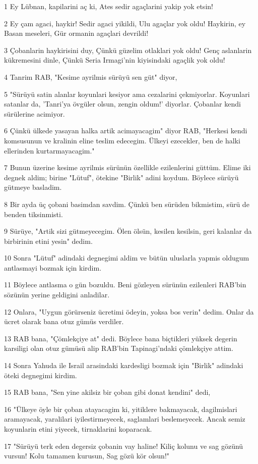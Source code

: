 \par 1 Ey Lübnan, kapilarini aç ki, Ates sedir agaçlarini yakip yok etsin!
\par 2 Ey çam agaci, haykir! Sedir agaci yikildi, Ulu agaçlar yok oldu! Haykirin, ey Basan meseleri, Gür ormanin agaçlari devrildi!
\par 3 Çobanlarin haykirisini duy, Çünkü güzelim otlaklari yok oldu! Genç aslanlarin kükremesini dinle, Çünkü Seria Irmagi'nin kiyisindaki agaçlik yok oldu!
\par 4 Tanrim RAB, "Kesime ayrilmis sürüyü sen güt" diyor,
\par 5 "Sürüyü satin alanlar koyunlari kesiyor ama cezalarini çekmiyorlar. Koyunlari satanlar da, 'Tanri'ya övgüler olsun, zengin oldum!' diyorlar. Çobanlar kendi sürülerine acimiyor.
\par 6 Çünkü ülkede yasayan halka artik acimayacagim" diyor RAB, "Herkesi kendi komsusunun ve kralinin eline teslim edecegim. Ülkeyi ezecekler, ben de halki ellerinden kurtarmayacagim."
\par 7 Bunun üzerine kesime ayrilmis sürünün özellikle ezilenlerini güttüm. Elime iki degnek aldim; birine "Lütuf", ötekine "Birlik" adini koydum. Böylece sürüyü gütmeye basladim.
\par 8 Bir ayda üç çobani basimdan savdim. Çünkü ben sürüden bikmistim, sürü de benden tiksinmisti.
\par 9 Sürüye, "Artik sizi gütmeyecegim. Ölen ölsün, kesilen kesilsin, geri kalanlar da birbirinin etini yesin" dedim.
\par 10 Sonra "Lütuf" adindaki degnegimi aldim ve bütün uluslarla yapmis oldugum antlasmayi bozmak için kirdim.
\par 11 Böylece antlasma o gün bozuldu. Beni gözleyen sürünün ezilenleri RAB'bin sözünün yerine geldigini anladilar.
\par 12 Onlara, "Uygun görürseniz ücretimi ödeyin, yoksa bos verin" dedim. Onlar da ücret olarak bana otuz gümüs verdiler.
\par 13 RAB bana, "Çömlekçiye at" dedi. Böylece bana biçtikleri yüksek degerin karsiligi olan otuz gümüsü alip RAB'bin Tapinagi'ndaki çömlekçiye attim.
\par 14 Sonra Yahuda ile Israil arasindaki kardesligi bozmak için "Birlik" adindaki öteki degnegimi kirdim.
\par 15 RAB bana, "Sen yine akilsiz bir çoban gibi donat kendini" dedi,
\par 16 "Ülkeye öyle bir çoban atayacagim ki, yitiklere bakmayacak, dagilmislari aramayacak, yaralilari iyilestirmeyecek, saglamlari beslemeyecek. Ancak semiz koyunlarin etini yiyecek, tirnaklarini koparacak.
\par 17 "Sürüyü terk eden degersiz çobanin vay haline! Kiliç kolunu ve sag gözünü vursun! Kolu tamamen kurusun, Sag gözü kör olsun!"

